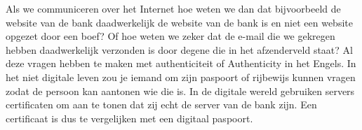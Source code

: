 Als we communiceren over het Internet hoe weten we dan dat bijvoorbeeld de website van de bank daadwerkelijk de website van de bank is en niet een website opgezet door een boef? Of hoe weten we zeker dat de e-mail die we gekregen hebben daadwerkelijk verzonden is door degene die in het afzenderveld staat? Al deze vragen hebben te maken met authenticiteit of Authenticity in het Engels. In het niet digitale leven zou je iemand om zijn paspoort of rijbewijs kunnen vragen zodat de persoon kan aantonen wie die is. In de digitale wereld gebruiken servers certificaten om aan te tonen dat zij echt de server van de bank zijn. Een certificaat is dus te vergelijken met een digitaal paspoort.
